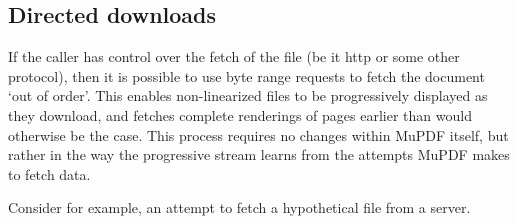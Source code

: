 \documentclass[oneside]{book}
\begin{document}
\subsection{Directed downloads}

If the caller has control over the fetch of the file (be it http or some other protocol), then it is possible to use byte range requests to fetch the document `out of order'. This enables non-linearized files to be progressively displayed as they download, and fetches complete renderings of pages earlier than would otherwise be the case. This process requires no changes within MuPDF itself, but rather in the way the progressive stream learns from the attempts MuPDF makes to fetch data.

Consider for example, an attempt to fetch a hypothetical file from a server.
\end{document}
